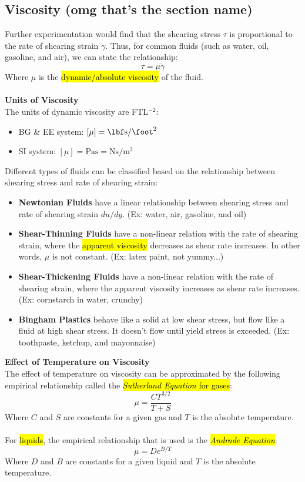 ﻿\documentclass[12pt]{article}
\begin{document}
\subsection*{Viscosity (omg that's the section name)}
Further experimentation would find that the shearing stress $\tau$ is proportional to the rate of shearing strain $\dot{\gamma}$. Thus, for common fluids (such as water, oil, gasoline, and air), we can state the relationship:
\[\tau = \mu \dot{\gamma}\]
Where $\mu$ is the \hl{dynamic/absolute viscosity} of the fluid.\\\\
\textbf{Units of Viscosity}\\
The units of dynamic viscosity are FTL$^{-2}$:
\begin{itemize}
    \item BG \& EE system: $[\mu] = \unit{\lbf\second\per\foot\squared}$
    \item SI system: $[\mu] = \unit{\pascal\second} = \unit{\newton\second\per\meter\squared}$
\end{itemize}
\begin{notebox}
Different types of fluids can be classified based on the relationship between shearing stress and rate of shearing strain:
\begin{itemize}
    \item \textbf{Newtonian Fluids} have a linear relationship between shearing stress and rate of shearing strain $du/dy$. (Ex: water, air, gasoline, and oil)
    \item \textbf{Shear-Thinning Fluids} have a non-linear relation with the rate of shearing strain, where the \hl{apparent viscosity} decreases as shear rate increases. In other words, $\mu$ is not constant. (Ex: latex paint, not yummy...)
    \item \textbf{Shear-Thickening Fluids} have a non-linear relation with the rate of shearing strain, where the apparent viscosity increases as shear rate increases. (Ex: cornstarch in water, crunchy)
    \item \textbf{Bingham Plastics} behave like a solid at low shear stress, but flow like a fluid at high shear stress. It doesn't flow until yield stress is exceeded. (Ex: toothpaste, ketchup, and mayonnaise) 
\end{itemize}
\end{notebox}
\textbf{Effect of Temperature on Viscosity}\\
The effect of temperature on viscosity can be approximated by the following empirical relationship called the \hl{\textit{Sutherland Equation} for gases}:
\[\mu = \frac{CT^{3/2}}{T+S}\]
Where $C$ and $S$ are constants for a given gas and $T$ is the absolute temperature.\\\\
For \hl{liquids}, the empirical relationship that is used is the \hl{\textit{Andrade Equation}}:
\[\mu = De^{B/T}\]
Where $D$ and $B$ are constants for a given liquid and $T$ is the absolute temperature.
\end{document}
